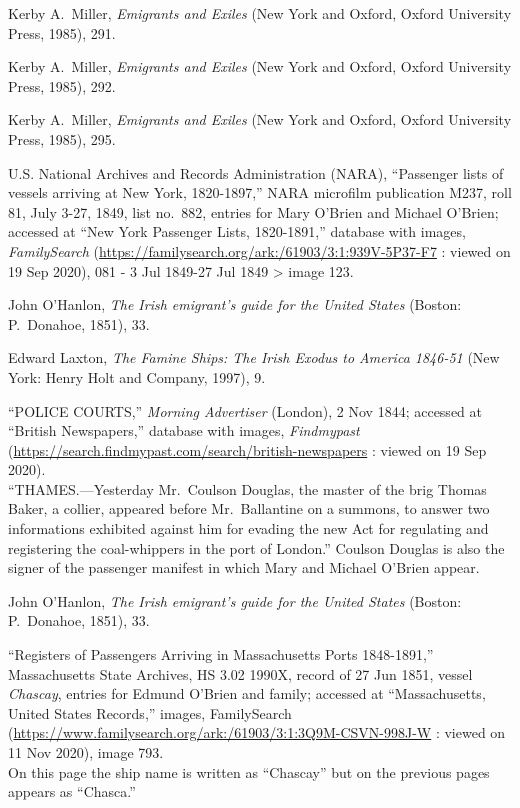 \begin{thebibliography}{999}
	

Kerby A.\ Miller, \textit{Emigrants and Exiles} (New York and Oxford, Oxford University Press, 1985), 291.

Kerby A.\ Miller, \textit{Emigrants and Exiles} (New York and Oxford, Oxford University Press, 1985), 292.

Kerby A.\ Miller, \textit{Emigrants and Exiles} (New York and Oxford, Oxford University Press, 1985), 295.

U.S. National Archives and Records Administration (NARA), ``Passenger lists of vessels arriving at New York, 1820-1897,'' NARA microfilm publication M237, roll 81, July 3-27, 1849, list no.\ 882, entries for Mary O'Brien and Michael O'Brien; accessed at ``New York Passenger Lists, 1820-1891,'' database with images, \textit{FamilySearch} (\url{https://familysearch.org/ark:/61903/3:1:939V-5P37-F7} : viewed on 19 Sep 2020), 081 - 3 Jul 1849-27 Jul 1849 > image 123.

John O'Hanlon, \textit{The Irish emigrant's guide for the United States} (Boston: P.\ Donahoe, 1851), 33.

Edward Laxton, \textit{The Famine Ships: The Irish Exodus to America 1846-51} (New York: Henry Holt and Company, 1997), 9. 

``POLICE COURTS,'' \textit{Morning Advertiser} (London), 2 Nov 1844; accessed at ``British Newspapers,'' database with images, \textit{Findmypast} (\url{https://search.findmypast.com/search/british-newspapers} : viewed on 19 Sep 2020).\\
``THAMES.---Yesterday Mr.\ Coulson Douglas, the master of the brig Thomas Baker, a collier, appeared before Mr.\ Ballantine on a summons, to answer two informations exhibited against him for evading the new Act for regulating and registering the coal-whippers in the port of London.'' Coulson Douglas is also the signer of the passenger manifest in which Mary and Michael O'Brien appear.

John O'Hanlon, \textit{The Irish emigrant's guide for the United States} (Boston: P.\ Donahoe, 1851), 33.

``Registers of Passengers Arriving in Massachusetts Ports 1848-1891,'' Massachusetts State Archives, HS 3.02 1990X, record of 27 Jun 1851, vessel \textit{Chascay}, entries for Edmund O'Brien and family; accessed at ``Massachusetts, United States Records,'' images, FamilySearch (\url{https://www.familysearch.org/ark:/61903/3:1:3Q9M-CSVN-998J-W} : viewed on 11 Nov 2020), image 793.\\
On this page the ship name is written as ``Chascay'' but on the previous pages appears as ``Chasca.''


\end{thebibliography}
